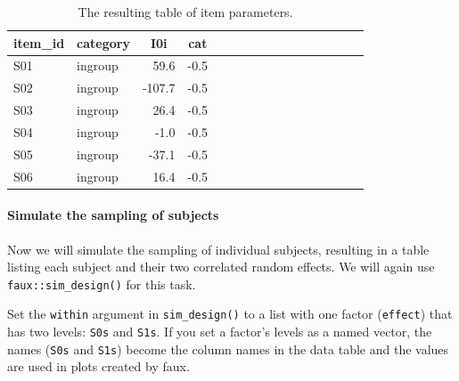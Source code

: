 \documentclass[man,floatsintext]{apa6}
\newenvironment{Shaded}{\begin{snugshade}}{\end{snugshade}}
\newcommand{\CommentTok}[1]{\textcolor[rgb]{0.56,0.35,0.01}{\textit{#1}}}
\newcommand{\FloatTok}[1]{\textcolor[rgb]{0.00,0.00,0.81}{#1}}
\newcommand{\KeywordTok}[1]{\textcolor[rgb]{0.13,0.29,0.53}{\textbf{#1}}}
\newcommand{\NormalTok}[1]{#1}
\newcommand{\OperatorTok}[1]{\textcolor[rgb]{0.81,0.36,0.00}{\textbf{#1}}}
\newcommand{\StringTok}[1]{\textcolor[rgb]{0.31,0.60,0.02}{#1}}
\let\oldparagraph\paragraph
\renewcommand{\paragraph}[1]{\oldparagraph{#1}\mbox{}}
\begin{document}
\begin{Shaded}
\end{Shaded}

\begin{table}[H]
\begin{center}
\begin{threeparttable}
\caption{\label{tab:items-table}The resulting table of item parameters.}
\begin{tabular}{llrrllrrllrrllrr}
\toprule
item\_id & \multicolumn{1}{c}{category} & \multicolumn{1}{c}{I0i} & \multicolumn{1}{c}{cat}\\
\midrule
S01 & ingroup & 59.6 & -0.5\\
S02 & ingroup & -107.7 & -0.5\\
S03 & ingroup & 26.4 & -0.5\\
S04 & ingroup & -1.0 & -0.5\\
S05 & ingroup & -37.1 & -0.5\\
S06 & ingroup & 16.4 & -0.5\\
\bottomrule
\end{tabular}
\end{threeparttable}
\end{center}
\end{table}

\hypertarget{simulate-the-sampling-of-subjects}{%
\paragraph{Simulate the sampling of subjects}\label{simulate-the-sampling-of-subjects}}

Now we will simulate the sampling of individual subjects, resulting in a table listing each subject and their two correlated random effects. We will again use \texttt{faux::sim\_design()} for this task.

Set the \texttt{within} argument in \texttt{sim\_design()} to a list with one factor (\texttt{effect}) that has two levels: \texttt{S0s} and \texttt{S1s}. If you set a factor's levels as a named vector, the names (\texttt{S0s} and \texttt{S1s}) become the column names in the data table and the values are used in plots created by faux.
\end{document}
